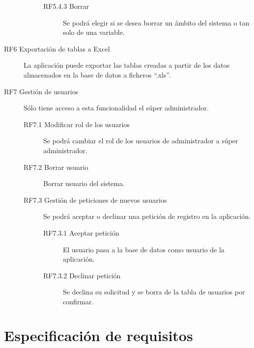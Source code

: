 \begin{description}
\begin{description}
\begin{description}
            \item [RF5.4.3 Borrar] Se podrá elegir si se desea borrar un ámbito del sistema o tan solo de una variable.
        \end{description}
    \end{description}
    \item [RF6 Exportación de tablas a Excel] La aplicación puede exportar las tablas creadas a partir de los datos almacenados en la base de datos a ficheros “.xls”.
    \item[RF7 Gestión de usuarios] Sólo tiene acceso a esta funcionalidad el súper administrador.
    \begin{description}
        \item[RF7.1 Modificar rol de los usuarios] Se podrá cambiar el rol de los usuarios de administrador a súper administrador.
        \item[RF7.2 Borrar usuario] Borrar usuario del sistema.
        \item[RF7.3 Gestión de peticiones de nuevos usuarios] Se podrá aceptar o declinar una petición de registro en la aplicación.
        \begin{description}
            \item[RF7.3.1 Aceptar petición] El usuario pasa a la base de datos como usuario de la aplicación.
            \item[RF7.3.2 Declinar petición] Se declina su solicitud y se borra de la tabla de usuarios por confirmar.
        \end{description}
    \end{description}
\end{description}
\section{Especificación de requisitos}


